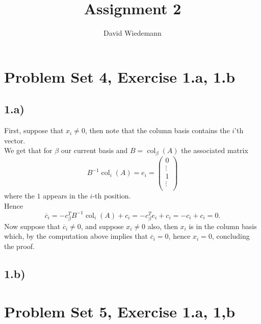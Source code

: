 \documentclass[11pt, a4paper]{article}
\DeclareMathOperator{\col}{col}
\begin{document}
\title{Assignment 2}
\author{David Wiedemann}
\maketitle
\section*{Problem Set 4, Exercise 1.a, 1.b}
\subsection*{1.a)}
First, suppose that $x_i\neq 0$, then note that the column basis contains the $i$'th vector.\\
We get that for $\beta$ our current basis and $B= \col_\beta( A) $ the associated matrix
\[ 
B^{-1}\col_i (A) = e_i = 
\begin{pmatrix}
0\\
\vdots\\
1\\
\vdots\\
\end{pmatrix} 
\]
where the $1$ appears in the $i$-th position.\\
Hence
\[ 
\overline{c}_i = -c_\beta^{T} B^{-1}\col_i( A) + c_i = - c_{\beta} ^{T} e_i + c_i = -c_i + c_i =0.
\]
Now suppose that $\overline{c}_i\neq 0$, and suppose $x_i \neq 0$ also, then $x_i$ is in the column basis which, by the computation above implies that $ \overline{c}_i=0$, hence $x_i =0$, concluding the proof.
\subsection*{1.b)}

\section*{Problem Set 5, Exercise 1.a, 1,b}
\end{document}

